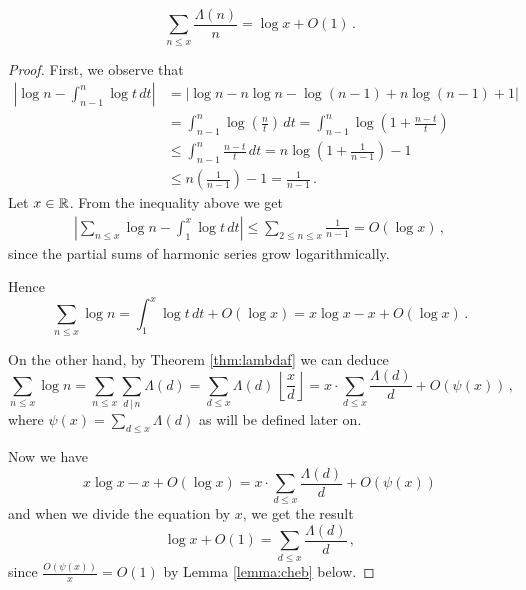 \documentclass{article}
\begin{document}
\begin{lemma}
\label{lemma:lambdadd}
\begin{equation*}
    \sum_{n\leq x} \frac{\Lambda(n)}{n} = \log x + O(1)\,.
\end{equation*}
\begin{proof}
First, we observe that
\begin{align*}
    \left\vert \log n - \int_{n-1}^n \log t \,dt \right\vert & = \vert \log n - n\log n -\log (n-1) + n\log (n-1) +1 \vert \\
    & = \int_{n-1}^n \log \left(\frac{n}{t}\right) \,dt = \int_{n-1}^n \log \left(1+\frac{n-t}{t}\right)\\
    & \leq \int_{n-1}^n \frac{n-t}{t} \,dt = n\log \left(1+\frac{1}{n-1}\right) - 1\\
    & \leq n\left(\frac{1}{n-1}\right) - 1 = \frac{1}{n-1}\,.
\end{align*}
Let $x\in\mathbb{R}$. From the inequality above we get
\begin{align*}
    \left\vert \sum_{n\leq x} \log n - \int_1^x \log t \,dt \right\vert \leq \sum_{2\leq n\leq x} \frac{1}{n-1} = O(\log x)\,,
\end{align*}
 since the partial sums of harmonic series grow logarithmically.
 
Hence
 \begin{equation*}
     \sum_{n\leq x} \log n = \int_1^x \log t\,dt + O(\log x) = x\log x - x + O(\log x)\,.
 \end{equation*}

On the other hand, by Theorem \ref{thm:lambdaf} we can deduce
\begin{equation*}
    \sum_{n\leq x} \log n = \sum_{n\leq x} \sum_{d\,\vert\, n} \Lambda(d) = \sum_{d\leq x} \Lambda(d)\,\left\lfloor \frac{x}{d}\right\rfloor = x\cdot\sum_{d\leq x} \frac{\Lambda(d)}{d} + O(\psi(x))\,,
\end{equation*}
where $\psi(x)=\sum_{d\leq x} \Lambda(d)$ as will be defined later on.

Now we have
\begin{equation*}
    x\log x - x + O(\log x) = x\cdot\sum_{d\leq x} \frac{\Lambda(d)}{d} + O(\psi(x))
\end{equation*}
and when we divide the equation by $x$, we get the result
\begin{equation*}
    \log x + O(1) = \sum_{d\leq x} \frac{\Lambda(d)}{d}\,,
\end{equation*}
since $\frac{O(\psi(x))}{x}=O(1)$ by Lemma \ref{lemma:cheb} below.
\end{proof}
\end{lemma}
\end{document}
